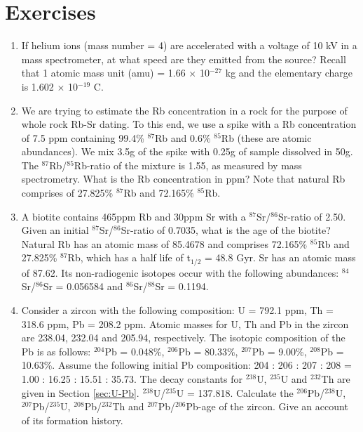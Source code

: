 \documentclass{book}
\begin{document}
\chapter{Exercises}
\label{sec:exercises}

\begin{enumerate}

\item If helium ions (mass number = 4) are accelerated with a voltage
  of 10 kV in a mass spectrometer, at what speed are they emitted from
  the source? Recall that 1 atomic mass unit (amu) = 1.66 $\times$
  10$^{-27}$ kg and the elementary charge is 1.602 $\times$ 10$^{-19}$
  C. 

\item We are trying to estimate the Rb concentration in a rock for the
  purpose of whole rock Rb-Sr dating. To this end, we use a spike with
  a Rb concentration of 7.5 ppm containing 99.4\% $^{87}$Rb and 0.6\%
  $^{85}$Rb (these are atomic abundances). We mix 3.5g of the spike
  with 0.25g of sample dissolved in 50g. The $^{87}$Rb/$^{85}$Rb-ratio
  of the mixture is 1.55, as measured by mass spectrometry. What is
  the Rb concentration in ppm? Note that natural Rb comprises of
  27.825\% $^{87}$Rb and 72.165\% $^{85}$Rb.  

\item A biotite contains 465ppm Rb and 30ppm Sr with a
  $^{87}$Sr/$^{86}$Sr-ratio of 2.50.  Given an initial
  $^{87}$Sr/$^{86}$Sr-ratio of 0.7035, what is the age of the biotite?
  Natural Rb has an atomic mass of 85.4678 and comprises 72.165\%
  $^{85}$Rb and 27.825\% $^{87}$Rb, which has a half life of t$_{1/2}$
  = 48.8 Gyr. Sr has an atomic mass of 87.62. Its non-radiogenic
  isotopes occur with the following abundances: $^{84}$Sr/$^{86}$Sr =
  0.056584 and $^{86}$Sr/$^{88}$Sr = 0.1194.

\item Consider a zircon with the following composition: U = 792.1 ppm,
  Th = 318.6 ppm, Pb = 208.2 ppm. Atomic masses for U, Th and Pb in
  the zircon are 238.04, 232.04 and 205.94, respectively. The isotopic
  composition of the Pb is as follows: $^{204}$Pb = 0.048\%,
  $^{206}$Pb = 80.33\%, $^{207}$Pb = 9.00\%, $^{208}$Pb =
  10.63\%. Assume the following initial Pb composition: 204 : 206 :
  207 : 208 = 1.00 : 16.25 : 15.51 : 35.73. The decay constants for
  $^{238}$U, $^{235}$U and $^{232}$Th are given in Section
  \ref{sec:U-Pb}. $^{238}$U/$^{235}$U = 137.818. Calculate the
  $^{206}$Pb/$^{238}$U, $^{207}$Pb/$^{235}$U, $^{208}$Pb/$^{232}$Th
  and $^{207}$Pb/$^{206}$Pb-age of the zircon. Give an account of its
  formation history. \\ 


\end{enumerate}
\end{document}
